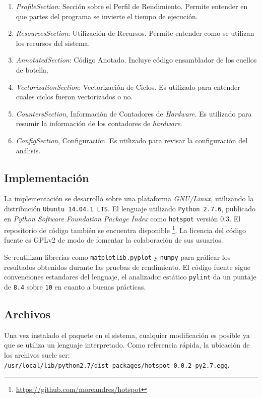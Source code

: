 \documentclass[a4paper]{report}
\begin{document}
\begin{enumerate}
\item {\it ProfileSection}: Sección sobre el Perfil de Rendimiento. Permite entender en que partes del programa se invierte el tiempo de ejecución.
\item {\it ResourcesSection}: Utilización de Recursos. Permite entender como se utilizan los recursos del sistema.
\item {\it AnnotatedSection}: Código Anotado. Incluye código ensamblador de los cuellos de botella. 
\item {\it VectorizationSection}: Vectorización de Ciclos. Es utilizado para entender cuales ciclos fueron vectorizados o no.
\item {\it CountersSection}, Información de Contadores de {\it Hardware}. Es utilizado para resumir la información de los contadores de {\it hardware}.
\item {\it ConfigSection}, Configuración. Es utilizado para revisar la configuración del análisis.
\end{enumerate}

\subsection{Implementación}

La implementación se desarrolló sobre una plataforma {\it GNU/Linux}, utilizando la distribución {\tt Ubuntu 14.04.1 LTS}.
El lenguaje utilizado {\tt Python 2.7.6}, publicado en {\it Python Software Foundation Package Index} como {\tt hotspot} versión 0.3.
El repositorio de código también se encuentra disponible \footnote{\href{https://github.com/moreandres/hotspot}{https://github.com/moreandres/hotspot}}.
La licencia del código fuente es GPLv2 de modo de fomentar la colaboración de sus usuarios.

\bigskip

Se reutilizan librerías como {\tt matplotlib.pyplot} \cite{matplotlib} y {\tt numpy} \cite{numpy} para gráficar los resultados obtenidos durante las pruebas de rendimiento.
El código fuente sigue convenciones estandares del lenguaje, el analizador estático {\tt pylint} da un puntaje de {\tt 8.4} sobre {\tt 10} en cuanto a buenas prácticas.

\subsection{Archivos}

Una vez instalado el paquete en el sistema, cualquier modificación es posible ya que se utiliza un lenguaje interpretado. 
Como referencia rápida, la ubicación de los archivos suele ser: \\ {\tt /usr/local/lib/python2.7/dist-packages/hotspot-0.0.2-py2.7.egg}.
\end{document}
